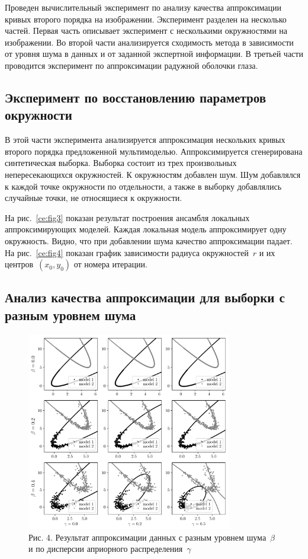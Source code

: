 \documentclass[12pt]{a&t}
\begin{document}
Проведен вычислительный эксперимент по анализу качества аппроксимации кривых второго порядка на изображении. Эксперимент разделен на несколько частей. Первая часть описывает эксперимент с несколькими окружностями на изображении. Во второй части анализируется сходимость метода в зависимости от уровня шума в данных и от заданной экспертной информации. В третьей части проводится эксперимент по аппроксимации радужной оболочки глаза.

\subsection{Эксперимент по восстановлению параметров окружности}

В этой части эксперимента анализируется аппроксимация нескольких кривых второго порядка предложенной мультимоделью. Аппроксимируется сгенерирована синтетическая выборка. Выборка состоит из трех произвольных непересекающихся окружностей. К окружностям добавлен шум. Шум добавлялся к каждой точке окружности по отдельности, а также в выборку добавлялись случайные точки, не относящиеся к окружности.

На рис.~\ref{ce:fig3} показан результат построения ансамбля локальных аппроксимирующих моделей. Каждая локальная модель аппроксимирует одну окружность. Видно, что при добавлении шума качество аппроксимации падает.
На рис.~\ref{ce:fig4} показан график зависимости радиуса окружностей~$r$ и их центров~$(x_0, y_0)$ от номера итерации.

\subsection{Анализ качества аппроксимации для выборки с разным уровнем шума}
\begin{figure}[h!t]
\begin{center}
    \includegraphics[width=0.8\textwidth]{beta_gamma}
\end{center}
\caption{Рис. 4. Результат аппроксимации данных с разным уровнем шума~$\beta$ и по дисперсии априорного распределения~$\gamma$}
\label{ce:fig6}
\end{figure}
\end{document}
